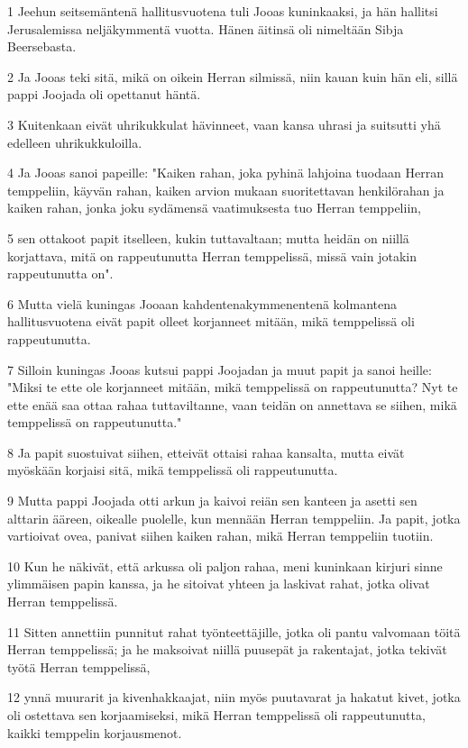 \par 1 Jeehun seitsemäntenä hallitusvuotena tuli Jooas kuninkaaksi, ja hän hallitsi Jerusalemissa neljäkymmentä vuotta. Hänen äitinsä oli nimeltään Sibja Beersebasta.
\par 2 Ja Jooas teki sitä, mikä on oikein Herran silmissä, niin kauan kuin hän eli, sillä pappi Joojada oli opettanut häntä.
\par 3 Kuitenkaan eivät uhrikukkulat hävinneet, vaan kansa uhrasi ja suitsutti yhä edelleen uhrikukkuloilla.
\par 4 Ja Jooas sanoi papeille: "Kaiken rahan, joka pyhinä lahjoina tuodaan Herran temppeliin, käyvän rahan, kaiken arvion mukaan suoritettavan henkilörahan ja kaiken rahan, jonka joku sydämensä vaatimuksesta tuo Herran temppeliin,
\par 5 sen ottakoot papit itselleen, kukin tuttavaltaan; mutta heidän on niillä korjattava, mitä on rappeutunutta Herran temppelissä, missä vain jotakin rappeutunutta on".
\par 6 Mutta vielä kuningas Jooaan kahdentenakymmenentenä kolmantena hallitusvuotena eivät papit olleet korjanneet mitään, mikä temppelissä oli rappeutunutta.
\par 7 Silloin kuningas Jooas kutsui pappi Joojadan ja muut papit ja sanoi heille: "Miksi te ette ole korjanneet mitään, mikä temppelissä on rappeutunutta? Nyt te ette enää saa ottaa rahaa tuttaviltanne, vaan teidän on annettava se siihen, mikä temppelissä on rappeutunutta."
\par 8 Ja papit suostuivat siihen, etteivät ottaisi rahaa kansalta, mutta eivät myöskään korjaisi sitä, mikä temppelissä oli rappeutunutta.
\par 9 Mutta pappi Joojada otti arkun ja kaivoi reiän sen kanteen ja asetti sen alttarin ääreen, oikealle puolelle, kun mennään Herran temppeliin. Ja papit, jotka vartioivat ovea, panivat siihen kaiken rahan, mikä Herran temppeliin tuotiin.
\par 10 Kun he näkivät, että arkussa oli paljon rahaa, meni kuninkaan kirjuri sinne ylimmäisen papin kanssa, ja he sitoivat yhteen ja laskivat rahat, jotka olivat Herran temppelissä.
\par 11 Sitten annettiin punnitut rahat työnteettäjille, jotka oli pantu valvomaan töitä Herran temppelissä; ja he maksoivat niillä puusepät ja rakentajat, jotka tekivät työtä Herran temppelissä,
\par 12 ynnä muurarit ja kivenhakkaajat, niin myös puutavarat ja hakatut kivet, jotka oli ostettava sen korjaamiseksi, mikä Herran temppelissä oli rappeutunutta, kaikki temppelin korjausmenot.
